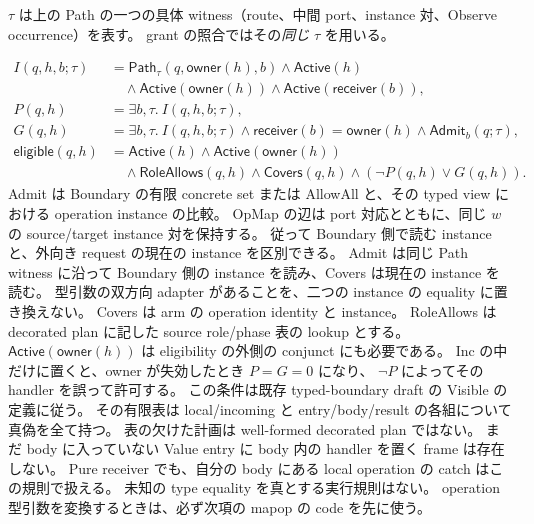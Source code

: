 \documentclass[11pt,a4paper]{article}
\begin{document}
\(\tau\) は上の Path の一つの具体 witness（route、中間 port、instance 対、Observe occurrence）を表す。
grant の照合ではその\emph{同じ} \(\tau\) を用いる。

\[
\begin{split}
 I(q,h,b;\tau)&=\mathsf{Path}_{\tau}(q,\mathsf{owner}(h),b)
 \land\mathsf{Active}(h)\\
 &\quad\land\mathsf{Active}(\mathsf{owner}(h))
 \land\mathsf{Active}(\mathsf{receiver}(b)),\\
 P(q,h)&=\exists b,\tau.\ I(q,h,b;\tau),\\
 G(q,h)&=\exists b,\tau.\ I(q,h,b;\tau)\land
       \mathsf{receiver}(b)=\mathsf{owner}(h)
       \land\mathsf{Admit}_{b}(q;\tau),\\
 \mathsf{eligible}(q,h)&=\mathsf{Active}(h)\land\mathsf{Active}(\mathsf{owner}(h))\\
       &\quad\land\mathsf{RoleAllows}(q,h)\land\mathsf{Covers}(q,h)
       \land(\neg P(q,h)\lor G(q,h)).
\end{split}
\]
Admit は Boundary の有限 concrete set または AllowAll と、その typed view における operation instance の比較。
OpMap の辺は port 対応とともに、同じ \(w\) の source/target instance 対を保持する。
従って Boundary 側で読む instance と、外向き request の現在の instance を区別できる。
Admit は同じ Path witness に沿って Boundary 側の instance を読み、Covers は現在の instance を読む。
型引数の双方向 adapter があることを、二つの instance の equality に置き換えない。
Covers は arm の operation identity と instance。
RoleAllows は decorated plan に記した source role/phase 表の lookup とする。
\(\mathsf{Active}(\mathsf{owner}(h))\) は eligibility の外側の conjunct にも必要である。
Inc の中だけに置くと、owner が失効したとき \(P=G=0\) になり、
\(\neg P\) によってその handler を誤って許可する。
この条件は既存 typed-boundary draft の Visible の定義に従う。
その有限表は local/incoming と entry/body/result の各組について真偽を全て持つ。
表の欠けた計画は well-formed decorated plan ではない。
まだ body に入っていない Value entry に body 内の handler を置く frame は存在しない。
Pure receiver でも、自分の body にある local operation の catch はこの規則で扱える。
未知の type equality を真とする実行規則はない。
operation 型引数を変換するときは、必ず次項の mapop の code を先に使う。
\end{document}
